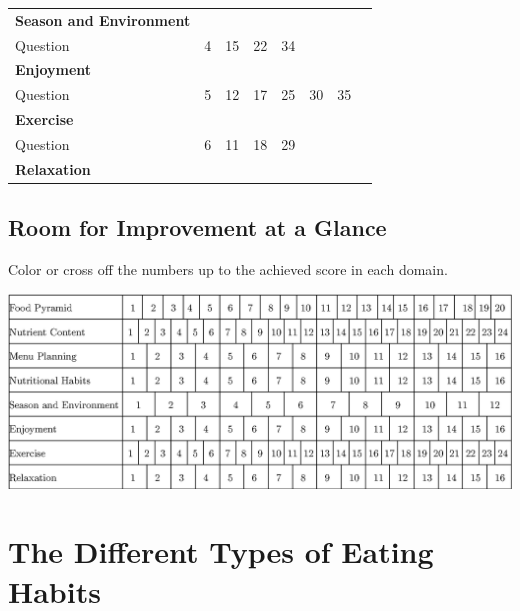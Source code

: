 \documentclass[../main.tex]{subfiles}
\begin{document}
\begin{tabular}{l|p{10mm}|p{10mm}|p{10mm}|p{10mm}|p{10mm}|p{10mm}||l|}
  \textbf{Season and Environment} & & & & & & & \\[2ex] \cline{1-5} \cline{8-8}
  \cellcolor{lightgray} Question & \cellcolor{lightgray} 4 & \cellcolor{lightgray} 15 &
  \cellcolor{lightgray} 22 & \cellcolor{lightgray} 34 & & & \\
  \textbf{Enjoyment} & & & & & & & \\ [2ex] \hline
  \cellcolor{lightgray} Question & \cellcolor{lightgray} 5 & \cellcolor{lightgray} 12 &
  \cellcolor{lightgray} 17 & \cellcolor{lightgray} 25 & \cellcolor{lightgray} 30 &
  \cellcolor{lightgray} 35 & \\
  \textbf{Exercise} & & & & & & & \\ [2ex]\hline
  \cellcolor{lightgray} Question & \cellcolor{lightgray} 6 & \cellcolor{lightgray} 11 &
  \cellcolor{lightgray} 18 & \cellcolor{lightgray} 29 & &
 & \\
  \textbf{Relaxation} & & & & & & & \\ [2ex] \cline{1-5} \cline{8-8}

\end{tabular}

\subsection{Room for Improvement at a Glance}

Color or cross off the numbers up to the achieved score in each domain.


\noindent \includegraphics[width=\linewidth]{ImprovementNutr}

\section{The Different Types of Eating Habits}
\end{document}
